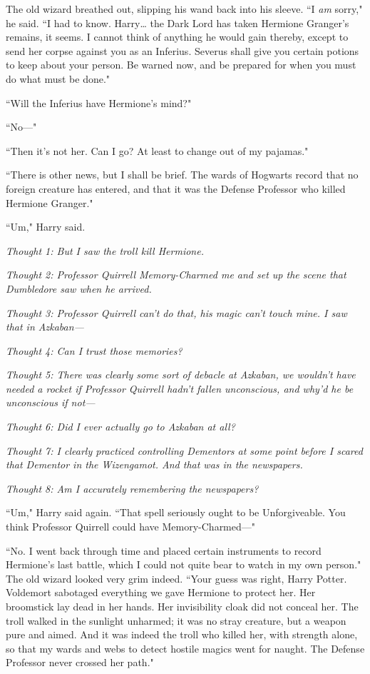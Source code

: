 The old wizard breathed out, slipping his wand back into his sleeve. ``I \emph{am} sorry," he said. ``I had to know. Harry{\ldots} the Dark Lord has taken Hermione Granger's remains, it seems. I cannot think of anything he would gain thereby, except to send her corpse against you as an Inferius. Severus shall give you certain potions to keep about your person. Be warned now, and be prepared for when you must do what must be done."

``Will the Inferius have Hermione's mind?"

``No—"

``Then it's not her. Can I go? At least to change out of my pajamas."

``There is other news, but I shall be brief. The wards of Hogwarts record that no foreign creature has entered, and that it was the Defense Professor who killed Hermione Granger."

``Um," Harry said.

\emph{Thought 1: But I saw the troll kill Hermione.}

\emph{Thought 2: Professor Quirrell Memory-Charmed me and set up the scene that Dumbledore saw when he arrived.}

\emph{Thought 3: Professor Quirrell can't do that, his magic can't touch mine. I saw that in Azkaban—}

\emph{Thought 4: Can I trust those memories?}

\emph{Thought 5: There was clearly some sort of debacle at Azkaban, we wouldn't have needed a rocket if Professor Quirrell hadn't fallen unconscious, and why'd he be unconscious if not—}

\emph{Thought 6: Did I ever actually go to Azkaban at all?}

\emph{Thought 7: I clearly practiced controlling Dementors at some point before I scared that Dementor in the Wizengamot. And \emph{that} was in the newspapers.}

\emph{Thought 8: Am I accurately remembering the newspapers?}

``Um," Harry said again. ``That spell seriously ought to be Unforgiveable. You think Professor Quirrell could have Memory-Charmed—"

``No. I went back through time and placed certain instruments to record Hermione's last battle, which I could not quite bear to watch in my own person." The old wizard looked very grim indeed. ``Your guess was right, Harry Potter. Voldemort sabotaged everything we gave Hermione to protect her. Her broomstick lay dead in her hands. Her invisibility cloak did not conceal her. The troll walked in the sunlight unharmed; it was no stray creature, but a weapon pure and aimed. And it was indeed the troll who killed her, with strength alone, so that my wards and webs to detect hostile magics went for naught. The Defense Professor never crossed her path."

